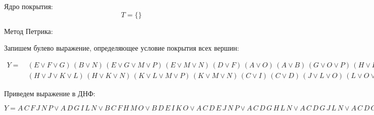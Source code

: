 \documentclass{article}
\begin{document}
Ядро покрытия:
\[T = \{ \}\]

Метод Петрика:


Запишем булево выражение, определяющее условие покрытия всех вершин:

$\begin{aligned}Y = & \: \left(E \lor F \lor G\right) \, \left(B \lor N\right) \, \left(E \lor G \lor M \lor P\right) \, \left(E \lor M \lor N\right) \, \left(D \lor F\right) \, \left(A \lor O\right) \, \left(A \lor B\right) \, \left(G \lor O \lor P\right) \, \left(H \lor I \lor J\right) \\ & \: \left(H \lor J \lor K \lor L\right) \, \left(H \lor K \lor N\right) \, \left(K \lor L \lor M \lor P\right) \, \left(K \lor M \lor N\right) \, \left(C \lor I\right) \, \left(C \lor D\right) \, \left(J \lor L \lor O\right) \, \left(L \lor O \lor P\right)\end{aligned}$

Приведем выражение в ДНФ:

$Y = A \, C \, F \, J \, N \, P \lor A \, D \, G \, I \, L \, N \lor B \, C \, F \, H \, M \, O \lor B \, D \, E \, I \, K \, O \lor A \, C \, D \, E \, J \, N \, P \lor A \, C \, D \, G \, H \, L \, N \lor A \, C \, D \, G \, J \, L \, N \lor A \, C \, D \, G \, J \, N \, P \lor A \, C \, F \, G \, H \, L \, N \lor A \, C \, F \, G \, I \, L \, N \lor A \, C \, F \, G \, J \, L \, N \lor A \, C \, F \, H \, L \, N \, P \lor A \, C \, F \, H \, M \, N \, O \lor A \, C \, F \, H \, N \, O \, P \lor A \, C \, F \, I \, L \, N \, P \lor A \, C \, F \, J \, M \, N \, O \lor A \, D \, E \, I \, J \, N \, P \lor A \, D \, E \, I \, K \, N \, O \lor A \, D \, E \, I \, L \, N \, O \lor A \, D \, E \, I \, L \, N \, P \lor A \, D \, F \, I \, J \, N \, P \lor A \, D \, F \, I \, L \, N \, P \lor A \, D \, G \, I \, J \, N \, P \lor A \, D \, G \, I \, K \, N \, O \lor B \, C \, D \, E \, H \, K \, O \lor B \, C \, D \, E \, H \, M \, O \lor B \, C \, D \, E \, J \, K \, O \lor B \, C \, D \, G \, H \, M \, O \lor B \, C \, E \, F \, H \, K \, O \lor B \, C \, E \, F \, I \, K \, O \lor B \, C \, E \, F \, J \, K \, O \lor B \, C \, F \, H \, N \, O \, P \lor B \, C \, F \, I \, K \, M \, O \lor B \, C \, F \, J \, K \, M \, O \lor B \, C \, F \, J \, M \, N \, O \lor B \, C \, F \, J \, N \, O \, P \lor B \, D \, E \, H \, I \, M \, O \lor B \, D \, E \, I \, L \, N \, O \lor B \, D \, F \, H \, I \, M \, O \lor B \, D \, F \, I \, K \, M \, O \lor B \, D \, G \, H \, I \, M \, O \lor B \, D \, G \, I \, K \, M \, O \lor B \, D \, G \, I \, K \, N \, O \lor B \, D \, G \, I \, L \, N \, O \lor \text{ ... термы высших рангов}$
\end{document}
